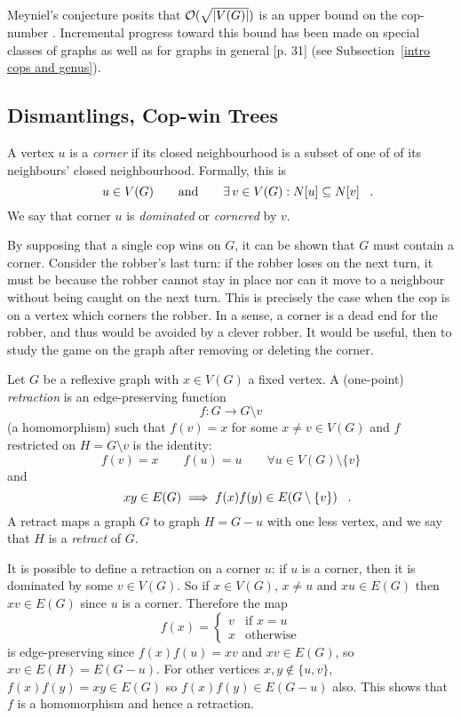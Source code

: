Meyniel's conjecture posits that $\mathcal{O}(\sqrt{\lvert V(G)\rvert })$ is an upper bound on the cop-number \cite{frankl1987cops}.
Incremental progress toward this bound has been made on special classes of graphs as well as for graphs in general  \cite{gera2016graph}[p. 31] (see Subsection~\ref{intro cops and genus}).

\subsection{Dismantlings, Cop-win Trees \label{intro dismantlings}}

A vertex $u$ is a \textit{corner} if its closed neighbourhood
is a subset of one of of its neighbours' closed neighbourhood. Formally, this is
\[u \in V(G) \qquad \text{and} \qquad \exists \, v\in V(G) : N[u] \subseteq N[v] \mperiod \]
We say that corner $u$ is \textit{dominated} or \textit{cornered} by $v$.

By supposing that a single cop wins on $G$, it can be shown that $G$ must contain a corner. Consider the robber's last turn: if the robber loses on the next turn, it must be because the robber cannot stay in place nor can it move to a neighbour without being caught on the next turn. This is precisely the case when the cop is on a vertex which corners the robber. In a sense, a corner is a dead end for the robber, and thus would be avoided by a clever robber. It would be useful, then to study the game on the graph after removing or deleting the corner.

Let $G$ be a reflexive graph with $x\in V(G)$ a fixed vertex. A (one-point) \textit{retraction} is an edge-preserving function
\[f : G \rightarrow G \setminus v \]
(a homomorphism) such that $f(v) = x$ for some $x \neq v \in V(G)$ and $f$ restricted on $H = G \setminus v$ is the identity:
\[ f(v) = x \qquad f(u) = u \qquad \forall u \in V(G)\setminus \{ v \} \]
and
\[ xy \in E(G) \implies f(x)f(y) \in E(G \setminus \{ v \}) \mperiod \]
A retract maps a graph $G$ to graph $H = G - u$ with one less vertex, and we say that $H$ is a \textit{retract} of $G$.

It is possible to define a retraction on a corner $u$: if $u$ is a corner, then it is
dominated by some $v \in V(G)$. So if $x \in V(G)$, $x \neq u$ and
$xu \in E(G)$ then $xv \in E(G)$ since $u$ is a corner. Therefore the map
\[ f(x) = \begin{cases}
v & \text{if } x = u \\
x & \text{otherwise}
\end{cases} \]
is edge-preserving since $f(x)f(u) = xv$ and $xv \in E(G)$, so $xv \in E(H) = E(G - u)$.
For other vertices $x,y \not\in \{u,v\}$, $f(x)f(y) = xy \in E(G)$ so $f(x)f(y) \in E(G- u)$ also.
This shows that $f$ is a homomorphism and hence a retraction.

